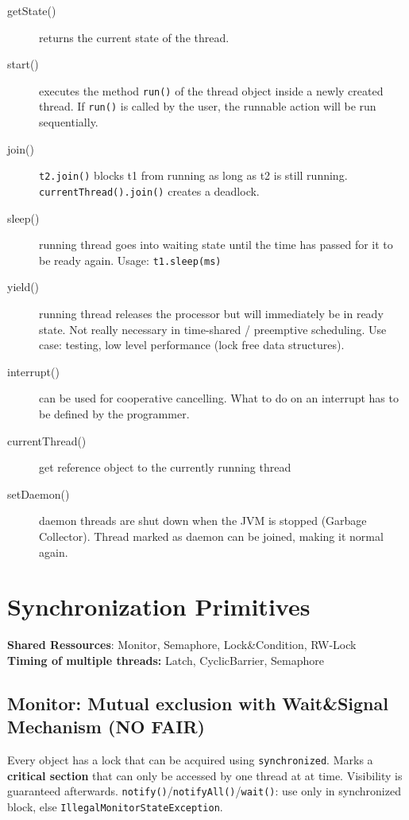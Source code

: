 \begin{description}
  \item[getState()] returns the current state of the thread.
  \item[start()] executes the method \texttt{run()} of the thread object inside a newly created thread. If \texttt{run()} is called by the user, the runnable action will be run sequentially.
  \item[join()] \texttt{t2.join()} blocks t1 from running as long as t2 is still running. \texttt{currentThread().join()} creates a deadlock.
  \item[sleep()] running thread goes into waiting state until the time has passed for it to be ready again. Usage: \texttt{t1.sleep(ms)}
  \item[yield()] running thread releases the processor but will immediately be in ready state. Not really necessary in time-shared / preemptive scheduling. Use case: testing, low level performance (lock free data structures).
  \item[interrupt()] can be used for cooperative cancelling. What to do on an interrupt has to be defined by the programmer. 
  \item[currentThread()] get reference object to the currently running thread
  \item[setDaemon()] daemon threads are shut down when the JVM is stopped (Garbage Collector). Thread marked as daemon can be joined, making it normal again.
\end{description}

\section{Synchronization Primitives}
\textbf{Shared Ressources}: Monitor, Semaphore, Lock\&Condition, RW-Lock \\
\textbf{Timing of multiple threads:} Latch, CyclicBarrier, Semaphore

\subsection{Monitor: Mutual exclusion with Wait\&Signal Mechanism (NO FAIR)}
Every object has a lock that can be acquired using \texttt{synchronized}. Marks a \textbf{critical section} that can only be accessed by one thread at at time. Visibility is guaranteed afterwards.
\texttt{notify()}/\texttt{notifyAll()}/\texttt{wait()}: use only in synchronized block, else \texttt{IllegalMonitorStateException}.

